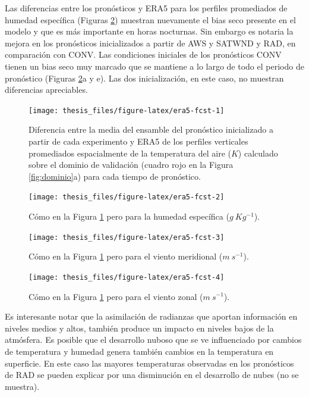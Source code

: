 \documentclass[12pt,oneside]{reedthesis}
\begin{document}
Las diferencias entre los pronósticos y ERA5 para los perfiles promediados de humedad específica (Figuras \ref{fig:era5-fcst-2}) muestran nuevamente el bias seco presente en el modelo y que es más importante en horas nocturnas. Sin embargo es notaria la mejora en los pronósticos inicializados a partir de AWS y SATWND y RAD, en comparación con CONV. Las condiciones iniciales de los pronósticos CONV tienen un bias seco muy marcado que se mantiene a lo largo de todo el periodo de pronóstico (Figuras \ref{fig:era5-fcst-2}a y e). Las dos inicialización, en este caso, no muestran diferencias apreciables.








\begin{figure}[ht]

{\centering \texttt{[image: thesis\_files/figure-latex/era5-fcst-1]} 

}

\caption{Diferencia entre la media del ensamble del pronóstico inicializado a partir de cada experimento y ERA5 de los perfiles verticales promediados espacialmente de la temperatura del aire (\(K\)) calculado sobre el dominio de validación (cuadro rojo en la Figura \ref{fig:dominio}a) para cada tiempo de pronóstico.}\label{fig:era5-fcst-1}
\end{figure}
\begin{figure}[ht]

{\centering \texttt{[image: thesis\_files/figure-latex/era5-fcst-2]} 

}

\caption{Cómo en la Figura \ref{fig:era5-fcst-1} pero para la humedad específica (\(g\ Kg^{-1}\)).}\label{fig:era5-fcst-2}
\end{figure}
\begin{figure}[ht]

{\centering \texttt{[image: thesis\_files/figure-latex/era5-fcst-3]} 

}

\caption{Cómo en la Figura \ref{fig:era5-fcst-1} pero para el viento meridional (\(m\ s^{-1}\)).}\label{fig:era5-fcst-3}
\end{figure}
\begin{figure}[ht]

{\centering \texttt{[image: thesis\_files/figure-latex/era5-fcst-4]} 

}

\caption{Cómo en la Figura \ref{fig:era5-fcst-1} pero para el viento zonal (\(m\ s^{-1}\)).}\label{fig:era5-fcst-4}
\end{figure}
Es interesante notar que la asimilación de radianzas que aportan información en niveles medios y altos, también produce un impacto en niveles bajos de la atmósfera. Es posible que el desarrollo nuboso que se ve influenciado por cambios de temperatura y humedad genera también cambios en la temperatura en superficie. En este caso las mayores temperaturas observadas en los pronósticos de RAD se pueden explicar por una disminución en el desarrollo de nubes (no se muestra).
\end{document}
